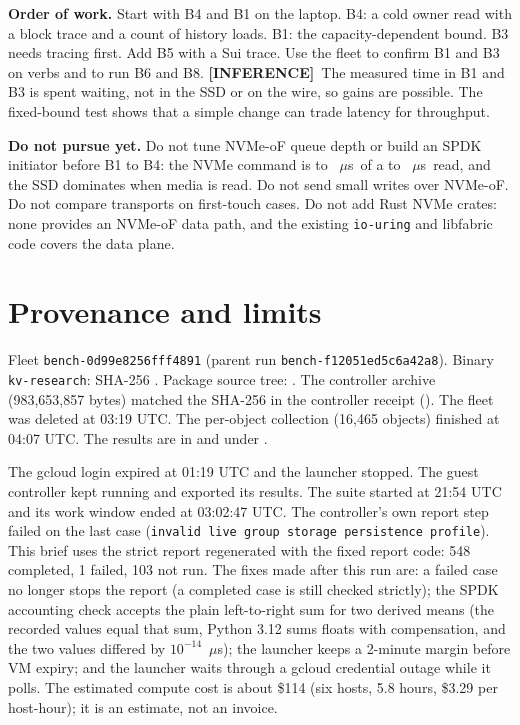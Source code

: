 \documentclass[10pt,a4paper]{article}
\newcommand{\us}{$\mu$s}
\newcommand{\inference}{\textbf{[INFERENCE]}}
\begin{document}
\textbf{Order of work.} Start with B4 and B1 on the laptop. B4: a cold owner read with a block trace and a count of history loads. B1: the capacity-dependent bound. B3 needs tracing first. Add B5 with a Sui trace. Use the fleet to confirm B1 and B3 on verbs and to run B6 and B8. \inference\ The measured time in B1 and B3 is spent waiting, not in the SSD or on the wire, so gains are possible. The fixed-bound test shows that a simple change can trade latency for throughput.

\textbf{Do not pursue yet.} Do not tune NVMe-oF queue depth or build an SPDK initiator before B1 to B4: the NVMe command is  to ~\us\ of a  to ~\us\ read, and the SSD dominates when media is read. Do not send small writes over NVMe-oF. Do not compare transports on first-touch cases. Do not add Rust NVMe crates: none provides an NVMe-oF data path, and the existing \texttt{io-uring} and libfabric code covers the data plane.

\section{Provenance and limits}
Fleet \texttt{bench-0d99e8256fff4891} (parent run \texttt{bench-f12051ed5c6a42a8}). Binary \texttt{kv-research}: SHA-256 . Package source tree: . The controller archive (983,653,857 bytes) matched the SHA-256 in the controller receipt (). The fleet was deleted at 03:19 UTC. The per-object collection (16,465 objects) finished at 04:07 UTC. The results are in  and under .

The gcloud login expired at 01:19 UTC and the launcher stopped. The guest controller kept running and exported its results. The suite started at 21:54 UTC and its work window ended at 03:02:47 UTC. The controller's own report step failed on the last case (\texttt{invalid live group storage persistence profile}). This brief uses the strict report regenerated with the fixed report code: 548 completed, 1 failed, 103 not run. The fixes made after this run are: a failed case no longer stops the report (a completed case is still checked strictly); the SPDK accounting check accepts the plain left-to-right sum for two derived means (the recorded values equal that sum, Python 3.12 sums floats with compensation, and the two values differed by $10^{-14}$~\us); the launcher keeps a 2-minute margin before VM expiry; and the launcher waits through a gcloud credential outage while it polls. The estimated compute cost is about \$114 (six hosts, 5.8 hours, \$3.29 per host-hour); it is an estimate, not an invoice.
\end{document}
